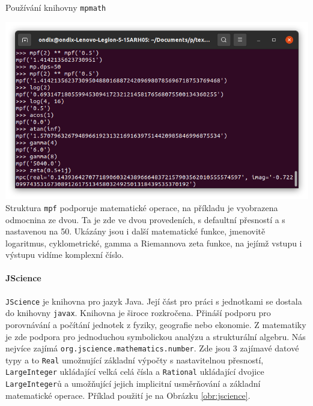 \begin{myfigure}{}
\caption{Používání knihovny \texttt{mpmath}}
\includegraphics[width=\linewidth]{./graphics/mpmath.png}\label{obr:mpmath}
Struktura \texttt{mpf} podporuje matematické operace, na příkladu je vyobrazena odmocnina ze dvou. Ta je zde ve dvou provedeních, s defaultní přesností a s nastavenou na 50. Ukázány jsou i další matematické funkce, jmenovitě logaritmus, cyklometrické, gamma a Riemannova zeta funkce, na jejímž vstupu i výstupu vidíme komplexní číslo.
\end{myfigure}

\paragraph{JScience \cite{jscience}}
\texttt{JScience} je knihovna pro jazyk Java. Její část pro práci s jednotkami se dostala do knihovny \texttt{javax}. Knihovna je široce rozkročena. Přináší podporu pro porovnávání a počítání jednotek z fyziky, geografie nebo ekonomie. Z matematiky je zde podpora pro jednoduchou symbolickou analýzu a strukturální algebru. Nás nejvíce zajímá \texttt{org.jscience.mathematics.number}. Zde jsou 3 zajímavé datové typy a to \texttt{Real} umožnující základní výpočty s nastavitelnou přesností, \texttt{LargeInteger} ukládající velká celá čísla a \texttt{Rational} ukládající dvojice \texttt{LargeInteger}ů a umožňující jejich implicitní usměrňování a základní matematické operace. Příklad použití je na Obrázku \ref{obr:jscience}.

